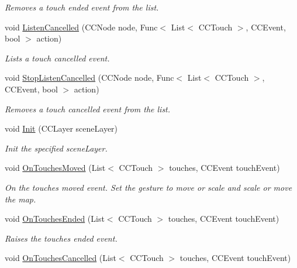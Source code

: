 \begin{DoxyCompactItemize}
\begin{DoxyCompactList}\small\item\em Removes a touch ended event from the list. \end{DoxyCompactList}\item 
void \hyperlink{classClient_1_1Common_1_1Views_1_1TouchHandler_a0379733869488e6be83c0a00c2645339}{Listen\+Cancelled} (C\+C\+Node node, Func$<$ List$<$ C\+C\+Touch $>$, C\+C\+Event, bool $>$ action)
\begin{DoxyCompactList}\small\item\em Lists a touch cancelled event. \end{DoxyCompactList}\item 
void \hyperlink{classClient_1_1Common_1_1Views_1_1TouchHandler_accffcba25a5555c9bec3daa164704b12}{Stop\+Listen\+Cancelled} (C\+C\+Node node, Func$<$ List$<$ C\+C\+Touch $>$, C\+C\+Event, bool $>$ action)
\begin{DoxyCompactList}\small\item\em Removes a touch cancelled event from the list. \end{DoxyCompactList}\item 
void \hyperlink{classClient_1_1Common_1_1Views_1_1TouchHandler_a1433c96d94455a33882d847045d23474}{Init} (C\+C\+Layer scene\+Layer)
\begin{DoxyCompactList}\small\item\em Init the specified scene\+Layer. \end{DoxyCompactList}\item 
void \hyperlink{classClient_1_1Common_1_1Views_1_1TouchHandler_ad028e4ba02913c0d9d4cb55a658b07aa}{On\+Touches\+Moved} (List$<$ C\+C\+Touch $>$ touches, C\+C\+Event touch\+Event)
\begin{DoxyCompactList}\small\item\em On the touches moved event. Set the gesture to move or scale and scale or move the map. \end{DoxyCompactList}\item 
void \hyperlink{classClient_1_1Common_1_1Views_1_1TouchHandler_a3598c47862156c696862c5017567d630}{On\+Touches\+Ended} (List$<$ C\+C\+Touch $>$ touches, C\+C\+Event touch\+Event)
\begin{DoxyCompactList}\small\item\em Raises the touches ended event. \end{DoxyCompactList}\item 
void \hyperlink{classClient_1_1Common_1_1Views_1_1TouchHandler_a0f333bcab9b32f67c642243b393f4510}{On\+Touches\+Cancelled} (List$<$ C\+C\+Touch $>$ touches, C\+C\+Event touch\+Event)

\end{DoxyCompactItemize}
